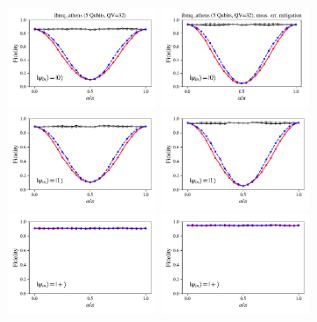 \documentclass[a4paper]{article}
\begin{document}
\begin{figure}[H]
	\centering
	\includegraphics[width=0.35\textwidth]{fidelity_qc7_mit1_state0}
	\includegraphics[width=0.35\textwidth]{fidelity_qc7_mit0_state0}
	\\
	\includegraphics[width=0.35\textwidth]{fidelity_qc7_mit1_state1}
	\includegraphics[width=0.35\textwidth]{fidelity_qc7_mit0_state1}
	\\
	\includegraphics[width=0.35\textwidth]{fidelity_qc7_mit1_state2}
	\includegraphics[width=0.35\textwidth]{fidelity_qc7_mit0_state2}

\end{figure}
\end{document}
